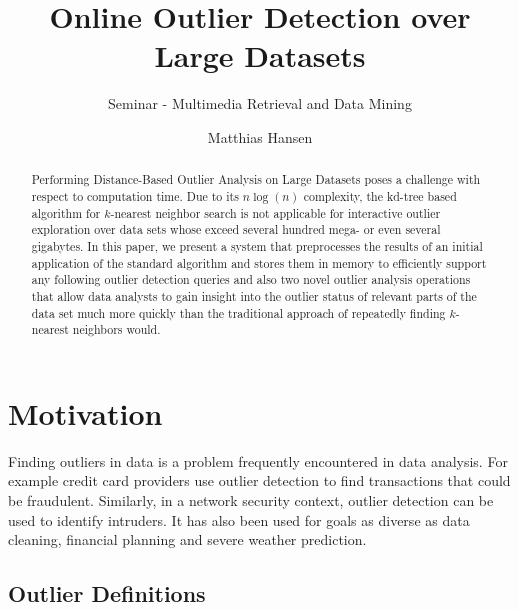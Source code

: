 \documentclass[runningheads]{llncs}
\begin{document}
%
%
%
%
%
\title{Online Outlier Detection over Large Datasets}
\subtitle{Seminar - Multimedia Retrieval and Data Mining}
%
\author{Matthias Hansen}
%
%

\maketitle              %

\begin{abstract}
Performing Distance-Based Outlier Analysis on Large Datasets poses a challenge with respect to computation time. Due to its $n\log(n)$ complexity, the kd-tree based algorithm for $k$-nearest neighbor search is not applicable for interactive outlier exploration over data sets whose exceed several hundred mega- or even several gigabytes. In this paper, we present a system that preprocesses the results of an initial application of the standard algorithm and stores them in memory to efficiently support any following outlier detection queries and also two novel outlier analysis operations that allow data analysts to gain insight into the outlier status of relevant parts of the data set much more quickly than the traditional approach of repeatedly finding $k$-nearest neighbors would.
\end{abstract}
\section{Motivation}
Finding outliers in data is a problem frequently encountered in data analysis. For example credit card providers use outlier detection to find transactions that could be fraudulent. Similarly, in a network security context, outlier detection can be used to identify intruders. It has also been used for goals as diverse as data cleaning, financial planning and severe weather prediction.

\subsection{Outlier Definitions}
\end{document}
